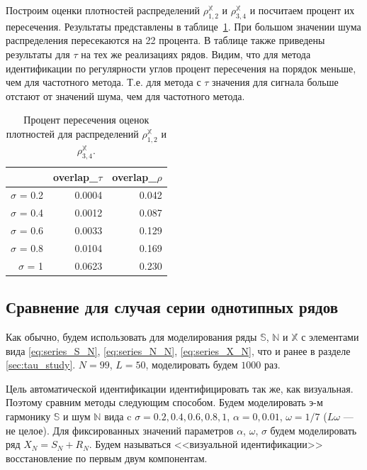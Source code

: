 \documentclass[specialist,
               substylefile = spbu.rtx,
               subf,href,colorlinks=true, 12pt]{disser}
\begin{document}
Построим оценки плотностей распределений $\rho^{\mathbb{X}}_{1,2}$  и  $\rho^{\mathbb{X}}_{3,4}$  и посчитаем процент их пересечения. Результаты представлены в таблице~\ref{tab:model_dist_pgram_overlap22}. При большом значении шума распределения пересекаются на 22 процента.
В таблице также приведены результаты для $\tau$ на тех же реализациях рядов. Видим, что для метода идентификации по регулярности углов процент пересечения на порядок меньше, чем для частотного метода.
Т.е. для метода с $\tau$ значения для сигнала больше отстают от значений шума, чем для частотного метода.

\begin{table}[hhh!]
\caption{Процент пересечения оценок плотностей для распределений $\rho^{\mathbb{X}}_{1,2}$  и $\rho^{\mathbb{X}}_{3,4}$.}
\centering
\begin{tabular}{rrr}
  \hline
& overlap\_$\tau$& overlap\_$\rho$ \\
  \hline
$\sigma$ = 0.2 & 0.0004 & 0.042 \\ 
  $\sigma$ = 0.4 & 0.0012 & 0.087 \\ 
  $\sigma$ = 0.6 & 0.0033 & 0.129 \\ 
  $\sigma$ = 0.8 & 0.0104 & 0.169 \\ 
  $\sigma$ = 1 & 0.0623 & 0.230 \\ 
   \hline
\end{tabular}
\label{tab:model_dist_pgram_overlap22}
\end{table}

\subsection{Сравнение для случая серии однотипных рядов}
\label{sec:comp_tau1_pgram_many_same_series}
Как обычно, будем использовать для моделирования ряды $\mathbb{S}$, $\mathbb{N}$ и $\mathbb{X}$ с элементами вида
\eqref{eq:series_S_N}, \eqref{eq:series_N_N}, \eqref{eq:series_X_N}, что и ранее в разделе \ref{sec:tau_study}.
$N = 99$, $L = 50$, моделировать будем $1000$ раз.

Цель автоматической идентификации идентифицировать так же, как визуальная.
Поэтому сравним методы следующим способом.
Будем моделировать э-м гармонику $\mathbb{S}$ и шум $\mathbb{N}$ вида
c $\sigma = 0.2, 0.4, 0.6, 0.8, 1$, $\alpha = 0, 0.01$, $\omega = 1/7$ ($L\omega$ --- не целое).
Для фиксированных значений параметров $\alpha$, $\omega$, $\sigma$ будем моделировать ряд $X_N = S_N + R_N$. Будем называться <<визуальной идентификации>> восстановление по первым двум компонентам.
\end{document}
